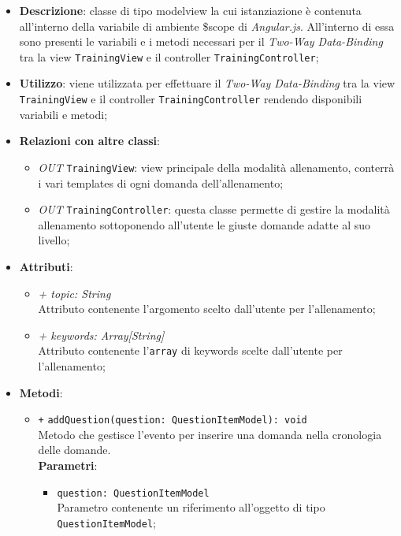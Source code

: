 	\begin{itemize}
		\item \textbf{Descrizione}: classe di tipo modelview la cui istanziazione è contenuta all'interno della variabile di ambiente \$scope di \textit{Angular.js}. All'interno di essa sono presenti le variabili e i metodi necessari per il \textit{Two-Way Data-Binding} tra la view \texttt{TrainingView} e il controller \texttt{TrainingController};
		\item \textbf{Utilizzo}: viene utilizzata per effettuare il \textit{Two-Way Data-Binding} tra la view \texttt{TrainingView} e il controller \texttt{TrainingController} rendendo disponibili variabili e metodi;
		\item \textbf{Relazioni con altre classi}: 
		\begin{itemize}
			\item \textit{OUT} \texttt{TrainingView}: view principale della modalità allenamento, conterrà i vari templates di ogni domanda dell'allenamento; 
			\item \textit{OUT} \texttt{TrainingController}: questa classe permette di gestire la modalità allenamento sottoponendo all'utente le giuste domande adatte al suo livello;
		\end{itemize}
		\item \textbf{Attributi}: 
		\begin{itemize}
			\item \textit{+ topic: String} \\
			Attributo contenente l'argomento scelto dall'utente per l'allenamento;
			\item \textit{+ keywords: Array[String]}\\
			Attributo contenente l'\texttt{array} di keywords scelte dall'utente per l'allenamento;
		\end{itemize}
		\item \textbf{Metodi}: 
		\begin{itemize}
			\item \texttt{+} \texttt{addQuestion(question: QuestionItemModel): void} \\
			Metodo che gestisce l'evento per inserire una domanda nella cronologia delle domande. \\
			\textbf{Parametri}:
			\begin{itemize}
				\item \texttt{question: QuestionItemModel} \\
				Parametro contenente un riferimento all'oggetto di tipo \texttt{QuestionItemModel};

\end{itemize}
\end{itemize}
\end{itemize}
